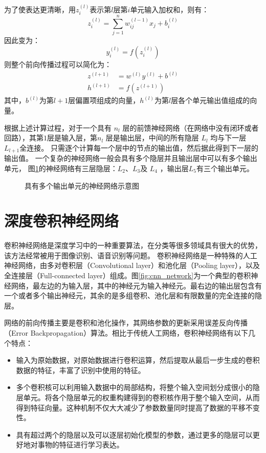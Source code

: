 为了使表达更清晰，用$ z^{(l)}_i $表示第$ l $层第$  i$单元输入加权和，则有：
\begin{equation}
  z_i^{(l)} = \sum_{j=1}^n w^{(l-1)}_{ij} x_j + b^{(l)}_i
\end{equation}
因此变为：
\begin{equation}
  y^{(l)}_i = f(z^{(l)}_i)
\end{equation}
则整个前向传播过程可以简化为：
\begin{align}
  z^{(l+1)} &= w^{(l)} y^{(l)} + b^{(l)}   \\
  h^{(l+1)} &= f(z^{(l+1)})
\end{align}
其中，$b^{(l)}$为第$l+1$层偏置项组成的向量，$h^{(l)}$为第$l$层各个单元输出值组成的向量。

根据上述计算过程，对于一个具有 $n_l$ 层的前馈神经网络（在网络中没有闭环或者回路），其第$   1 $层是输入层，第$n_l$ 层是输出层，中间的所有隐层 $L_l$ 均与下一层 $L_{l+1}$全连接。
只需逐个计算每一个层中的节点的输出值，然后据此得到下一层的输出值。
一个复杂的神经网络一般会具有多个隐层并且输出层中可以有多个输出单元，
图\ref{fig:network2}的神经网络有三层隐层：$  L_2 $、$ L_3$及 $ L_4$ ，输出层$  L_5 $有三个输出单元。

\begin{figure}[hbt]
  \centering
  \sWuhao
  
  \caption{具有多个输出单元的神经网络示意图}
  \label{fig:network2}
\end{figure}

\section{深度卷积神经网络}
\label{sec:cnn}
卷积神经网络是深度学习中的一种重要算法，在分类等很多领域具有很大的优势，该方法经常被用于图像识别、语音识别等问题。
卷积神经网络是一种特殊的人工神经网络，由多对卷积层（Convolutional layer）和池化层（Pooling layer），以及全连接层（Full-connected layer）组成。图\ref{fig:cnn_network}为一个典型的卷积神经网络，最左边的为输入层，其中的神经元为输入神经元。最右边的输出层包含有一个或者多个输出神经元，其余的是多组卷积、池化层和有限数量的完全连接的隐层。

网络的前向传播主要是卷积和池化操作，其网络参数的更新采用误差反向传播（Error Backpropagation）算法。相比于传统人工网络，卷积神经网络有以下几个特点：
\begin{itemize}
  \item 输入为原始数据，对原始数据进行卷积运算，然后提取从最后一步生成的卷积数据的特征，丰富了识别中使用的特征。
  \item 多个卷积核可以利用输入数据中的局部结构，将整个输入空间划分成很小的隐层单元。将各个隐层单元的权重构建得到的卷积核作用于整个输入空间，从而得到特征向量。这种机制不仅大大减少了参数数量同时提高了数据的平移不变性。
  \item 具有超过两个的隐层以及可以逐层初始化模型的参数，通过更多的隐层可以更好地对事物的特征进行学习表达。
\end{itemize}

